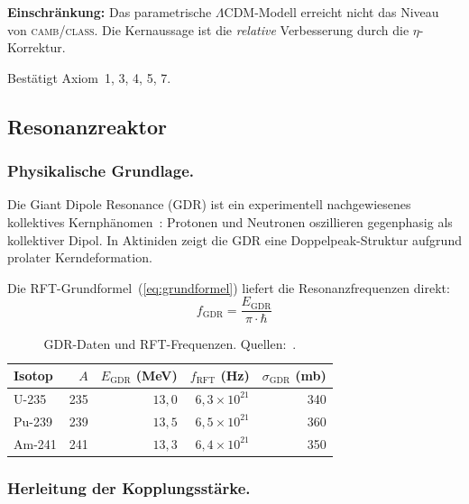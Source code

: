 \documentclass[12pt]{iopart}
\begin{document}
	\noindent
	\textbf{Einschr\"ankung:} Das parametrische
	$\Lambda$CDM-Modell erreicht nicht das Niveau von
	\textsc{camb}/\textsc{class}. Die Kernaussage ist
	die \textit{relative} Verbesserung durch die
	$\eta$-Korrektur.
	
	Best\"atigt Axiom~1, 3, 4, 5, 7.
	
	\subsection{Resonanzreaktor}
	\label{sec:resonanzreaktor}
	
	\subsubsection{Physikalische Grundlage.}
	
	Die Giant Dipole Resonance (GDR) ist ein experimentell
	nachgewiesenes kollektives
	Kernph\"anomen~\cite{gdr_atlas,ishkhanov2021}:
	Protonen und Neutronen oszillieren gegenphasig als
	kollektiver Dipol. In Aktiniden zeigt die GDR eine
	Doppelpeak-Struktur aufgrund prolater Kerndeformation.
	
	Die RFT-Grundformel~(\ref{eq:grundformel}) liefert
	die Resonanzfrequenzen direkt:
	\begin{equation}
		f_{\mathrm{GDR}} =
		\frac{E_{\mathrm{GDR}}}{\pi \cdot \hbar}
		\label{eq:f_gdr}
	\end{equation}
	
	\begin{table}[ht]
		\centering
		\caption{GDR-Daten und RFT-Frequenzen.
			Quellen:~\cite{gdr_atlas,ishkhanov2021,ripl3}.}
		\label{tab:gdr}
		\begin{tabular}{lrrrr}
			\hline
			Isotop & $A$
			& $E_{\mathrm{GDR}}$ (MeV)
			& $f_{\mathrm{RFT}}$ (Hz)
			& $\sigma_{\mathrm{GDR}}$ (mb) \\
			\hline
			U-235 & 235 & $13{,}0$
			& $6{,}3 \times 10^{21}$ & 340 \\
			Pu-239 & 239 & $13{,}5$
			& $6{,}5 \times 10^{21}$ & 360 \\
			Am-241 & 241 & $13{,}3$
			& $6{,}4 \times 10^{21}$ & 350 \\
			\hline
		\end{tabular}
	\end{table}
	
	\subsubsection{Herleitung der Kopplungsst\"arke.}
	
\end{document}
